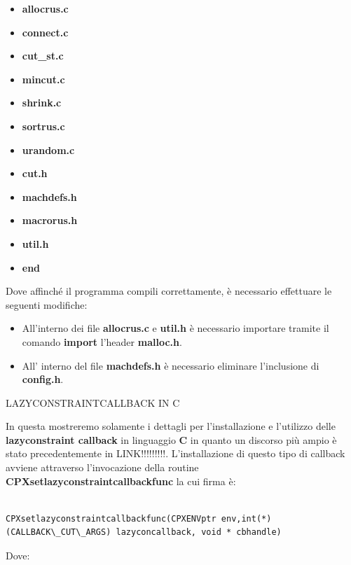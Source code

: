 \documentclass[11pt]{article}
\begin{document}
\begin{itemize}
    \item \textbf{allocrus.c}
    \item \textbf{connect.c}
    \item \textbf{cut\_st.c}
    \item \textbf{mincut.c}
    \item \textbf{shrink.c}
    \item \textbf{sortrus.c}
    \item \textbf{urandom.c}
    \item \textbf{cut.h}
    \item \textbf{machdefs.h}
    \item \textbf{macrorus.h}
    \item \textbf{util.h}
    \item \textbf{end}
\end{itemize}

Dove affinché il programma compili correttamente, è necessario effettuare le seguenti modifiche:

\begin{itemize}
    \item All'interno dei file \textbf{allocrus.c} e \textbf{util.h} è necessario importare tramite il comando \textbf{import} l'header \textbf{malloc.h}.
    \item All' interno del file \textbf{machdefs.h} è necessario eliminare l'inclusione di \textbf{config.h}.
\end{itemize}

\vspace{2\baselineskip}
LAZYCONSTRAINTCALLBACK IN C
\vspace{2\baselineskip}


In questa mostreremo solamente i dettagli per l'installazione e l'utilizzo delle \textbf{lazyconstraint callback} in linguaggio \textbf{C} in quanto un discorso più ampio è stato precedentemente in LINK!!!!!!!!!.
L'installazione di questo tipo di callback avviene attraverso l'invocazione della routine \textbf{CPXsetlazyconstraintcallbackfunc} la cui firma è:

\begin{lstlisting}

CPXsetlazyconstraintcallbackfunc(CPXENVptr env,int(*)(CALLBACK\_CUT\_ARGS) lazyconcallback, void * cbhandle)

\end{lstlisting}

Dove:
\end{document}
